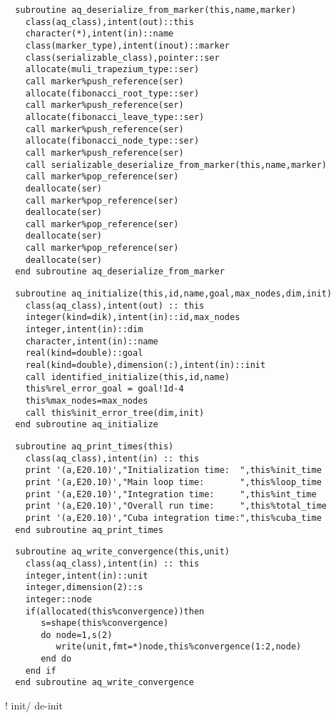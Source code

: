 \begin{Verbatim}
  subroutine aq_deserialize_from_marker(this,name,marker)
    class(aq_class),intent(out)::this
    character(*),intent(in)::name
    class(marker_type),intent(inout)::marker
    class(serializable_class),pointer::ser
    allocate(muli_trapezium_type::ser)
    call marker%push_reference(ser)
    allocate(fibonacci_root_type::ser)
    call marker%push_reference(ser)
    allocate(fibonacci_leave_type::ser)
    call marker%push_reference(ser)
    allocate(fibonacci_node_type::ser)
    call marker%push_reference(ser)
    call serializable_deserialize_from_marker(this,name,marker)
    call marker%pop_reference(ser)
    deallocate(ser)
    call marker%pop_reference(ser)
    deallocate(ser)
    call marker%pop_reference(ser)
    deallocate(ser)
    call marker%pop_reference(ser)
    deallocate(ser)
  end subroutine aq_deserialize_from_marker
\end{Verbatim}
\begin{Verbatim}
  subroutine aq_initialize(this,id,name,goal,max_nodes,dim,init)
    class(aq_class),intent(out) :: this
    integer(kind=dik),intent(in)::id,max_nodes
    integer,intent(in)::dim
    character,intent(in)::name
    real(kind=double)::goal
    real(kind=double),dimension(:),intent(in)::init
    call identified_initialize(this,id,name)
    this%rel_error_goal = goal!1d-4
    this%max_nodes=max_nodes
    call this%init_error_tree(dim,init)
  end subroutine aq_initialize
\end{Verbatim}
\begin{Verbatim}
  subroutine aq_print_times(this)
    class(aq_class),intent(in) :: this
    print '(a,E20.10)',"Initialization time:  ",this%init_time
    print '(a,E20.10)',"Main loop time:       ",this%loop_time
    print '(a,E20.10)',"Integration time:     ",this%int_time
    print '(a,E20.10)',"Overall run time:     ",this%total_time
    print '(a,E20.10)',"Cuba integration time:",this%cuba_time
  end subroutine aq_print_times
\end{Verbatim}
\begin{Verbatim}
  subroutine aq_write_convergence(this,unit)
    class(aq_class),intent(in) :: this
    integer,intent(in)::unit
    integer,dimension(2)::s
    integer::node
    if(allocated(this%convergence))then
       s=shape(this%convergence)
       do node=1,s(2)
          write(unit,fmt=*)node,this%convergence(1:2,node)
       end do
    end if
  end subroutine aq_write_convergence
\end{Verbatim}
! init/ de-init

